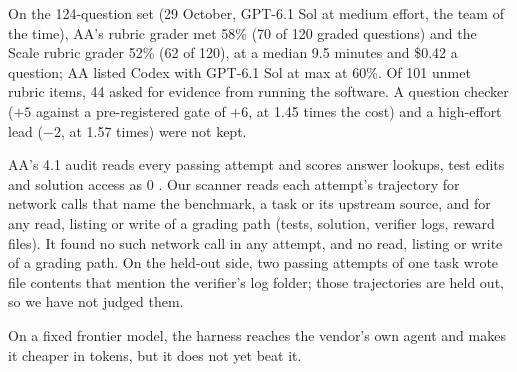  On the 124-question set \citep{raghavendra2026sweatlas} (29 October, GPT-6.1 Sol
at medium effort, the team of the time), AA's rubric grader met 58\% (70 of 120 graded questions)
and the Scale rubric grader 52\% (62 of 120), at a median 9.5 minutes and \$0.42 a question; AA
listed Codex with GPT-6.1 Sol at max at 60\%. Of 101 unmet rubric items, 44 asked for evidence from
running the software. A question checker ($+5$ against a pre-registered gate of $+6$, at 1.45 times
the cost) and a high-effort lead ($-2$, at 1.57 times) were not kept.

 AA's 4.1 audit reads every passing attempt and scores answer lookups,
test edits and solution access as 0 \citep{aa2026coding}. Our scanner reads each attempt's
trajectory for network calls that name the benchmark, a task or its upstream source, and for any
read, listing or write of a grading path (tests, solution, verifier logs, reward files). It found
no such network call in any attempt, and no read, listing or write of a grading path. On the
held-out side, two passing attempts of one task wrote file contents that mention the verifier's log
folder; those trajectories are held out, so we have not judged them.

 On a fixed frontier model, the harness reaches the vendor's own agent and makes
it cheaper in tokens, but it does not yet beat it.
